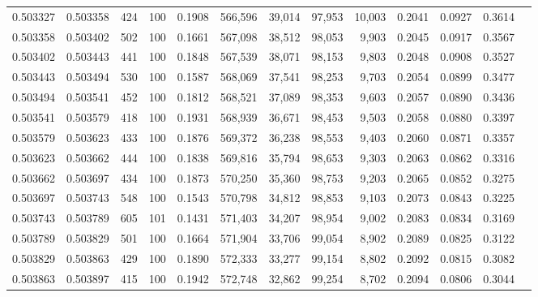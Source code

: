 \begin{tabular}{rrrrrrrrrrrrr}
0.503327 & 0.503358 &   424 & 100 &                                     0.1908 & 566,596 &  39,014 &  97,953 &  10,003 & 0.2041 & 0.0927 & 0.3614 \\
0.503358 & 0.503402 &   502 & 100 &                                     0.1661 & 567,098 &  38,512 &  98,053 &   9,903 & 0.2045 & 0.0917 & 0.3567 \\
0.503402 & 0.503443 &   441 & 100 &                                     0.1848 & 567,539 &  38,071 &  98,153 &   9,803 & 0.2048 & 0.0908 & 0.3527 \\
0.503443 & 0.503494 &   530 & 100 &                                     0.1587 & 568,069 &  37,541 &  98,253 &   9,703 & 0.2054 & 0.0899 & 0.3477 \\
0.503494 & 0.503541 &   452 & 100 &                                     0.1812 & 568,521 &  37,089 &  98,353 &   9,603 & 0.2057 & 0.0890 & 0.3436 \\
0.503541 & 0.503579 &   418 & 100 &                                     0.1931 & 568,939 &  36,671 &  98,453 &   9,503 & 0.2058 & 0.0880 & 0.3397 \\
0.503579 & 0.503623 &   433 & 100 &                                     0.1876 & 569,372 &  36,238 &  98,553 &   9,403 & 0.2060 & 0.0871 & 0.3357 \\
0.503623 & 0.503662 &   444 & 100 &                                     0.1838 & 569,816 &  35,794 &  98,653 &   9,303 & 0.2063 & 0.0862 & 0.3316 \\
0.503662 & 0.503697 &   434 & 100 &                                     0.1873 & 570,250 &  35,360 &  98,753 &   9,203 & 0.2065 & 0.0852 & 0.3275 \\
0.503697 & 0.503743 &   548 & 100 &                                     0.1543 & 570,798 &  34,812 &  98,853 &   9,103 & 0.2073 & 0.0843 & 0.3225 \\
0.503743 & 0.503789 &   605 & 101 &                                     0.1431 & 571,403 &  34,207 &  98,954 &   9,002 & 0.2083 & 0.0834 & 0.3169 \\
0.503789 & 0.503829 &   501 & 100 &                                     0.1664 & 571,904 &  33,706 &  99,054 &   8,902 & 0.2089 & 0.0825 & 0.3122 \\
0.503829 & 0.503863 &   429 & 100 &                                     0.1890 & 572,333 &  33,277 &  99,154 &   8,802 & 0.2092 & 0.0815 & 0.3082 \\
0.503863 & 0.503897 &   415 & 100 &                                     0.1942 & 572,748 &  32,862 &  99,254 &   8,702 & 0.2094 & 0.0806 & 0.3044 \\

\end{tabular}
